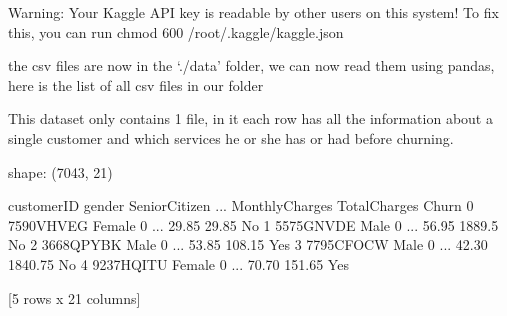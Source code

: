 \documentclass[letterpaper,10pt,english]{jupyterBook}
\begin{document}
\begin{sphinxVerbatim}[commandchars=\\\{\}]
Warning: Your Kaggle API key is readable by other users on this system! To fix this, you can run \PYGZsq{}chmod 600 /root/.kaggle/kaggle.json\PYGZsq{}
\end{sphinxVerbatim}

\sphinxAtStartPar
the csv files are now in the ‘./data’ folder, we can now read them using pandas, here is the list of all csv files in our folder

\begin{sphinxVerbatim}[commandchars=\\\{\}]
\end{sphinxVerbatim}

\begin{sphinxVerbatim}
\end{sphinxVerbatim}

\sphinxAtStartPar
This dataset only contains 1 file, in it each row has all the information about a single customer and which services he or she has or had before churning.

\begin{sphinxVerbatim}[commandchars=\\\{\}]
  
  
\end{sphinxVerbatim}

\begin{sphinxVerbatim}[commandchars=\\\{\}]
shape: (7043, 21)
\end{sphinxVerbatim}

\begin{sphinxVerbatim}[commandchars=\\\{\}]
   customerID  gender  SeniorCitizen  ... MonthlyCharges TotalCharges  Churn
0  7590\PYGZhy{}VHVEG  Female              0  ...          29.85        29.85     No
1  5575\PYGZhy{}GNVDE    Male              0  ...          56.95       1889.5     No
2  3668\PYGZhy{}QPYBK    Male              0  ...          53.85       108.15    Yes
3  7795\PYGZhy{}CFOCW    Male              0  ...          42.30      1840.75     No
4  9237\PYGZhy{}HQITU  Female              0  ...          70.70       151.65    Yes

[5 rows x 21 columns]
\end{sphinxVerbatim}
\end{document}
